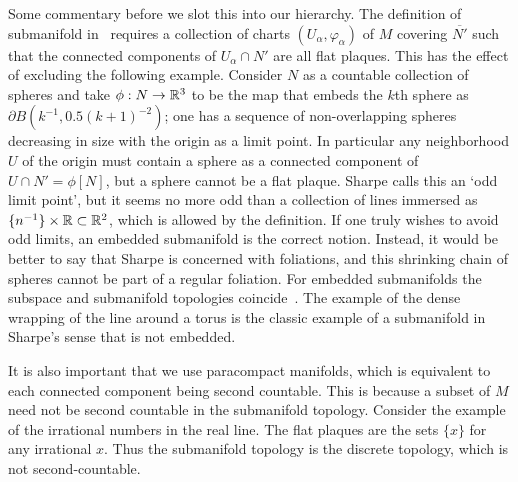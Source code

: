 Some commentary before we slot this into our hierarchy.
The definition of submanifold in~\cite{Sharpe1997} requires a collection of charts $(U_\alpha, \varphi_\alpha)$ of $M$ covering $\overline{N'}$ such that the connected components of $U_\alpha \cap N'$ are all flat plaques.
This has the effect of excluding the following example.
Consider $N$ as a countable collection of spheres and take $\phi : N \to \mathbb{R}^3$ to be the map that embeds the $k$th sphere as $\partial B(k^{-1}, 0.5(k+1)^{-2})$; one has a sequence of non-overlapping spheres decreasing in size with the origin as a limit point.
In particular any neighborhood $U$ of the origin must contain a sphere as a connected component of $U \cap N' = \phi[N]$, but a sphere cannot be a flat plaque.
Sharpe calls this an `odd limit point', but it seems no more odd than a collection of lines immersed as $\{n^{-1}\} \times \mathbb{R} \subset \mathbb{R}^2$, which is allowed by the definition.
If one truly wishes to avoid odd limits, an embedded submanifold is the correct notion.
Instead, it would be better to say that Sharpe is concerned with foliations, and this shrinking chain of spheres cannot be part of a regular foliation.
For embedded submanifolds the subspace and submanifold topologies coincide~\cite[Prop~1.2.9]{Sharpe1997}.
The example of the dense wrapping of the line around a torus is the classic example of a submanifold in Sharpe's sense that is not embedded.

It is also important that we use paracompact manifolds, which is equivalent to each connected component being second countable.
This is because a subset of $M$ need not be second countable in the submanifold topology.
Consider the example of the irrational numbers in the real line.
The flat plaques are the sets $\{x\}$ for any irrational $x$.
Thus the submanifold topology is the discrete topology, which is not second-countable.

